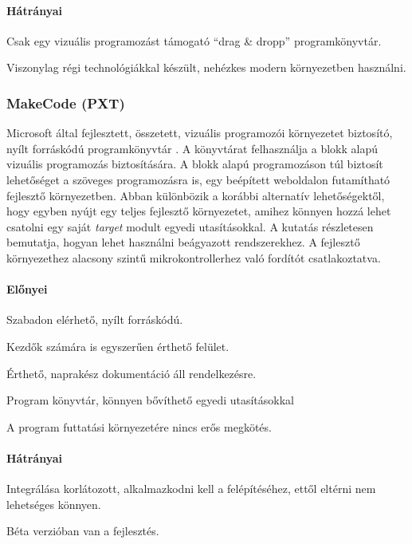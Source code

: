 \documentclass[12pt,a4paper,oneside]{report} %
\begin{document}
\paragraph{Hátrányai} 
\begin{compactitem}
	\item Csak egy vizuális programozást támogató  ``drag \& dropp'' programkönyvtár.
	\item Viszonylag régi technológiákkal készült, nehézkes modern környezetben használni.
\end{compactitem}

\subsubsection{MakeCode (PXT)}
\label{pxt}
Microsoft által fejlesztett, összetett, vizuális programozói környezetet biztosító, nyílt forráskódú programkönyvtár \cite{seneviratne2019makecode}. A  könyvtárat felhasználja a blokk alapú vizuális programozás biztosítására. A blokk alapú programozáson túl biztosít lehetőséget a szöveges programozásra is, egy beépített weboldalon futamítható fejlesztő környezetben. Abban különbözik a korábbi alternatív lehetőségektől, hogy egyben nyújt egy teljes fejlesztő környezetet, amihez könnyen hozzá lehet csatolni egy saját \textit{target} modult egyedi utasításokkal. A \cite{devine2018makecode} kutatás részletesen bemutatja, hogyan lehet használni beágyazott rendszerekhez. A fejlesztő környezethez alacsony szintű mikrokontrollerhez való fordítót csatlakoztatva.
\paragraph{Előnyei} 
\begin{compactitem}
	\item Szabadon elérhető, nyílt forráskódú.
	\item Kezdők számára is egyszerűen érthető felület.
	\item Érthető, naprakész dokumentáció áll rendelkezésre.
	\item Program könyvtár, könnyen bővíthető egyedi utasításokkal
	\item A program futtatási környezetére nincs erős megkötés.
\end{compactitem}
\paragraph{Hátrányai} 
\begin{compactitem}
	\item Integrálása korlátozott, alkalmazkodni kell a felépítéséhez, ettől eltérni nem lehetséges könnyen.
	\item Béta verzióban van a fejlesztés.
\end{compactitem}
\end{document}
